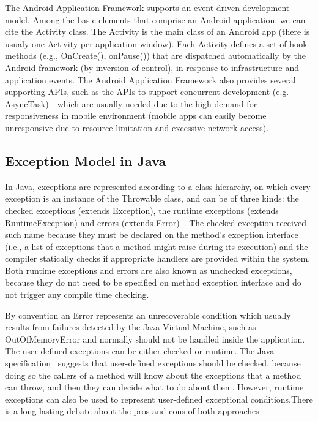 \documentclass[conference]{IEEEtran}
\begin{document}
The Android Application Framework supports an event-driven development model. 
Among the basic elements that comprise an Android application, we can cite the
 Activity class. The Activity is the main class of an Android app (there is usualy one
Activity per application window). Each Activity defines a set of hook methods  
(e.g., OnCreate(), onPause()) that are dispatched automatically by the Android 
framework (by inversion of control), in response to infrastructure and application events.
The Android Application Framework also provides several supporting APIs, such as 
the APIs to support concurrent development (e.g. AsyncTask) - 
which are usually needed due to the high demand for responsiveness 
in mobile environment (mobile apps can easily become 
unresponsive due to resource limitation and excessive network access).



\subsection{Exception Model in Java} \label{sec:extypes}

In Java, exceptions are represented according to a class hierarchy, on which
 every exception is an instance of the Throwable class, and can be of three kinds: the checked exceptions
(extends Exception), the runtime exceptions (extends RuntimeException) and errors
(extends Error)~\cite{gosling2000java}. The checked exception received such name
 because they must be declared on the method's exception interface (i.e., a list of exceptions that a method 
might raise during its execution) and the compiler statically checks if
 appropriate handlers are provided within the system.
Both runtime exceptions and errors are also known as unchecked exceptions, because 
they do not need to be specified on method exception interface and do not trigger any 
compile time checking.

By convention an Error represents an unrecoverable condition which usually results
from failures detected by the Java Virtual Machine, such as OutOfMemoryError and
normally should not be handled inside the application. The user-defined exceptions 
can be either checked or runtime. The Java specification~\cite{gosling2000java} 
suggests that user-defined exceptions should be checked, because doing so 
the callers of a method will know about the exceptions that a method can throw, and then 
they can decide what to do about them. However, runtime exceptions can also be 
used to represent user-defined exceptional conditions.There is a long-lasting debate 
about the pros and cons of both approaches~\cite{javatut,stackoverlow,debate}
\end{document}
